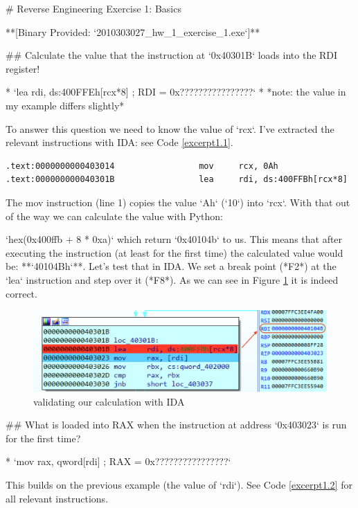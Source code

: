 \nocite{pracbin}

\begin{markdown}

# Reverse Engineering Exercise 1: Basics

**[Binary Provided: `2010303027_hw_1_exercise_1.exe`]**

## Calculate the value that the instruction at `0x40301B` loads into the RDI register!

* `lea rdi, ds:400FFEh[rcx*8] ; RDI = 0x????????????????`
* *note: the value in my example differs slightly*

\noindent\s To answer this question we need to know the value of `rcx`. I've extracted the relevant instructions with IDA: see Code \ref{excerpt1.1}.
\s

\end{markdown}
\begin{lstlisting}[language={[x86masm]Assembler},name={excerpt of relevant instructions task 1.1},label={excerpt1.1}]
.text:0000000000403014                 mov     rcx, 0Ah
.text:000000000040301B                 lea     rdi, ds:400FFBh[rcx*8]
\end{lstlisting}
\begin{markdown}

The mov instruction (line 1) copies the value `Ah` (`10`) into `rcx`. With that out of the way we can calculate the value with Python:

`hex(0x400ffb + 8 * 0xa)` which return `0x40104b` to us.
\n
This means that after executing the instruction (at least for the first time) the calculated value would be: **`40104Bh`**.
\n
Let's test that in IDA. We set a break point (*F2*) at the `lea` instruction and step over it (*F8*). As we can see in Figure \ref{calc} it is indeed correct.
\begin{figure}[!htbp]
\centering
\includegraphics[width=.87\linewidth]{media/calc.png}
\caption{validating our calculation with IDA}\label{calc}
\end{figure}

## What is loaded into RAX when the instruction at address `0x403023` is run for the first time?

* `mov rax, qword[rdi] ; RAX = 0x????????????????`

\noindent\s
This builds on the previous example (the value of `rdi`). See Code \ref{excerpt1.2} for all relevant instructions.\s

\end{markdown}
